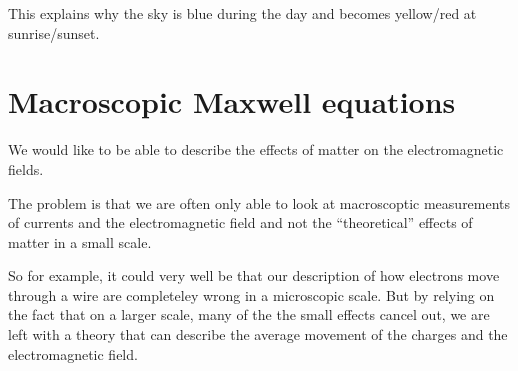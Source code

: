 This explains why the sky is blue during the day and becomes yellow/red at sunrise/sunset.


\section{Macroscopic Maxwell equations}
We would like to be able to describe the effects of matter on the electromagnetic fields.

The problem is that we are often only able to look at macroscoptic measurements of currents and the electromagnetic field and not the ``theoretical'' effects of matter in a small scale.

So for example, it could very well be that our description of how electrons move through a wire are completeley wrong in a microscopic scale.
But by relying on the fact that on a larger scale, many of the  the small effects cancel out, we are left with a theory that can describe the average movement of the charges and the electromagnetic field.


